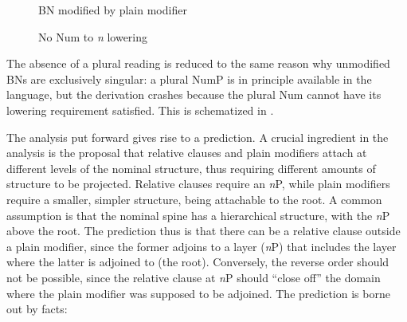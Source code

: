 \documentclass[output=paper]{langscibook}
\begin{document}
\begin{figure}
\begin{floatrow}
\captionsetup{margin=.05\linewidth}
        {\caption{BN modified by plain modifier\label{fon:pLEjNBrZlTrE}}}%
        {\caption{No Num to \textit{n} lowering\label{fig:BrexApNoLowWw}}}
\end{floatrow}
\end{figure}

		
The absence of a plural reading is reduced to the same reason why unmodified BNs are exclusively singular: a plural NumP is in principle available in the language, but the derivation crashes because the plural Num cannot have its lowering requirement satisfied. This is schematized in .
	
	The analysis put forward gives rise to a prediction. A crucial ingredient in the analysis is the proposal that relative clauses and plain modifiers attach at different levels of the nominal structure, thus requiring different amounts of structure to be projected. Relative clauses require an \textit{n}P, while plain modifiers require a smaller, simpler structure, being attachable to the root. A common assumption is that the nominal spine has a hierarchical structure, with the \textit{n}P above the root. The prediction thus is that there can be a relative clause outside a plain modifier, since the former adjoins to a layer (\textit{n}P) that includes the layer where the latter is adjoined to (the root). Conversely, the reverse order should not be possible, since the relative clause at \textit{n}P should ``close off'' the domain where the plain modifier was supposed to be adjoined. The prediction is borne out by facts:
	
\end{document}
